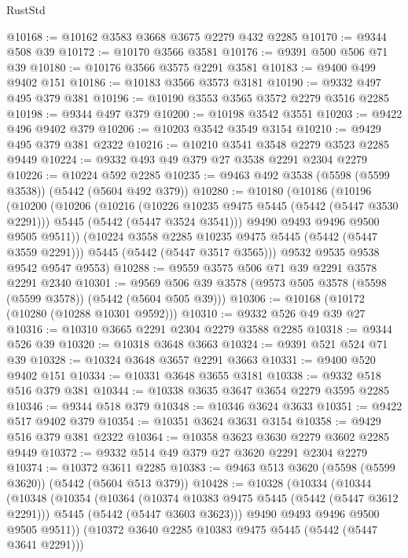 \begin{lexlean}{RustStd}
\begin{coremodule}
{\begin{coremodule}
{{{{{{{{{{{{@10168 := @10162 @3583 @3668 @3675 @2279 @432 @2285
@10170 := @9344 @508 @39
@10172 := @10170 @3566 @3581
@10176 := @9391 @500 @506 @71 @39
@10180 := @10176 @3566 @3575 @2291 @3581
@10183 := @9400 @499 @9402 @151
@10186 := @10183 @3566 @3573 @3181
@10190 := @9332 @497 @495 @379 @381
@10196 := @10190 @3553 @3565 @3572 @2279 @3516 @2285
@10198 := @9344 @497 @379
@10200 := @10198 @3542 @3551
@10203 := @9422 @496 @9402 @379
@10206 := @10203 @3542 @3549 @3154
@10210 := @9429 @495 @379 @381 @2322
@10216 := @10210 @3541 @3548 @2279 @3523 @2285 @9449
@10224 := @9332 @493 @49 @379 @27 @3538 @2291 @2304 @2279
@10226 := @10224 @592 @2285
@10235 := @9463 @492 @3538 (@5598 (@5599 @3538)) (@5442 (@5604 @492 @379))
@10280 := @10180
    (@10186
      (@10196
        (@10200
          (@10206
            (@10216
              (@10226 @10235 @9475 @5445 (@5442 (@5447 @3530 @2291)))
              @5445
              (@5442 (@5447 @3524 @3541)))
            @9490
            @9493
            @9496
            @9500
            @9505
            @9511))
        (@10224 @3558 @2285 @10235 @9475 @5445 (@5442 (@5447 @3559 @2291)))
        @5445
        (@5442 (@5447 @3517 @3565)))
      @9532
      @9535
      @9538
      @9542
      @9547
      @9553)
@10288 := @9559 @3575 @506 @71 @39 @2291 @3578 @2291 @2340
@10301 := @9569 @506 @39 @3578 (@9573 @505 @3578 (@5598 (@5599 @3578)) (@5442 (@5604 @505 @39)))
@10306 := @10168 (@10172 (@10280 (@10288 @10301 @9592)))
@10310 := @9332 @526 @49 @39 @27
@10316 := @10310 @3665 @2291 @2304 @2279 @3588 @2285
@10318 := @9344 @526 @39
@10320 := @10318 @3648 @3663
@10324 := @9391 @521 @524 @71 @39
@10328 := @10324 @3648 @3657 @2291 @3663
@10331 := @9400 @520 @9402 @151
@10334 := @10331 @3648 @3655 @3181
@10338 := @9332 @518 @516 @379 @381
@10344 := @10338 @3635 @3647 @3654 @2279 @3595 @2285
@10346 := @9344 @518 @379
@10348 := @10346 @3624 @3633
@10351 := @9422 @517 @9402 @379
@10354 := @10351 @3624 @3631 @3154
@10358 := @9429 @516 @379 @381 @2322
@10364 := @10358 @3623 @3630 @2279 @3602 @2285 @9449
@10372 := @9332 @514 @49 @379 @27 @3620 @2291 @2304 @2279
@10374 := @10372 @3611 @2285
@10383 := @9463 @513 @3620 (@5598 (@5599 @3620)) (@5442 (@5604 @513 @379))
@10428 := @10328
    (@10334
      (@10344
        (@10348
          (@10354
            (@10364
              (@10374 @10383 @9475 @5445 (@5442 (@5447 @3612 @2291)))
              @5445
              (@5442 (@5447 @3603 @3623)))
            @9490
            @9493
            @9496
            @9500
            @9505
            @9511))
        (@10372 @3640 @2285 @10383 @9475 @5445 (@5442 (@5447 @3641 @2291)))
}}}}}}}}}}}}
\end{coremodule}}
\end{coremodule}
\end{lexlean}
